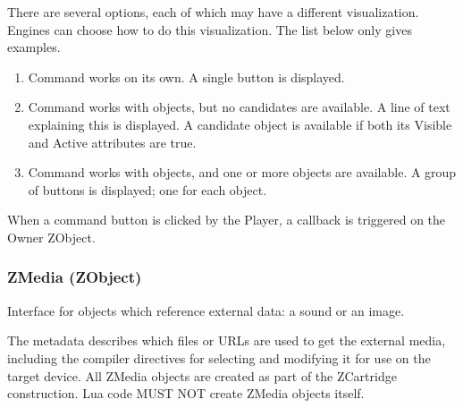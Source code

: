\documentclass{article}
\begin{document}
There are several options, each of which may have a different visualization.
Engines can choose how to do this visualization. The list below only gives
examples.

\begin{enumerate}
	\item Command works on its own. A single button is displayed.
	\item Command works with objects, but no candidates are available. A line of text explaining this is displayed. A candidate object is available if both its Visible and Active attributes are true.
	\item Command works with objects, and one or more objects are available. A group of buttons is displayed; one for each object.
\end{enumerate}

When a command button is clicked by the Player, a callback is triggered on the Owner ZObject.


\subsubsection{ZMedia (ZObject)}
Interface for objects which reference external data: a sound or an image.

The metadata describes which files or URLs are used to get the external media,
including the compiler directives for selecting and modifying it for use on the
target device. All ZMedia objects are created as part of the ZCartridge
construction. Lua code MUST NOT create ZMedia objects itself.
\end{document}
